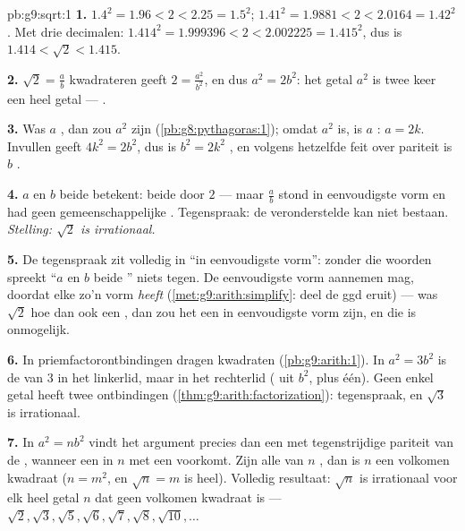 \begin{solution}{pb:g9:sqrt:1}
\textbf{1.} $1.4^2 = 1.96 < 2 < 2.25 = 1.5^2$;
$1.41^2 = 1.9881 < 2 < 2.0164 = 1.42^2$. Met drie decimalen:
$1.414^2 = 1.999396 < 2 < 2.002225 = 1.415^2$, dus is
$1.414 < \sqrt2 < 1.415$.

\textbf{2.} $\sqrt2 = \frac ab$ kwadrateren geeft $2 = \frac{a^2}{b^2}$, en dus
$a^2 = 2b^2$: het getal $a^2$ is twee keer een heel getal --- \emph{}.

\textbf{3.} Was $a$ , dan zou $a^2$  zijn
(\cref{pb:g8:pythagoras:1}); omdat $a^2$  is, is $a$ : $a = 2k$.
Invullen geeft $4k^2 = 2b^2$, dus is $b^2 = 2k^2$ , en volgens hetzelfde feit
over pariteit is $b$ .

\textbf{4.} $a$ en $b$ beide  betekent: beide  door $2$ --- maar
$\frac ab$ stond in eenvoudigste vorm en had geen gemeenschappelijke .
Tegenspraak: de veronderstelde  kan niet bestaan. \emph{Stelling: $\sqrt2$ is
irrationaal.}

\textbf{5.} De tegenspraak zit volledig in ``in eenvoudigste vorm'': zonder die
woorden spreekt ``$a$ en $b$ beide '' niets tegen. De eenvoudigste vorm
aannemen mag, doordat elke  zo'n vorm \emph{heeft}
(\cref{met:g9:arith:simplify}: deel de ggd eruit) --- was $\sqrt2$ hoe dan ook een
, dan zou het een  in eenvoudigste vorm zijn, en die is onmogelijk.

\textbf{6.} In priemfactorontbindingen dragen kwadraten  
(\cref{pb:g9:arith:1}). In $a^2 = 3b^2$ is de  van $3$  in het
linkerlid, maar  in het rechterlid ( uit $b^2$, plus één). Geen enkel
getal heeft twee ontbindingen (\cref{thm:g9:arith:factorization}): tegenspraak, en
$\sqrt3$ is irrationaal.

\textbf{7.} In $a^2 = n b^2$ vindt het argument precies dan een  met
tegenstrijdige pariteit van de , wanneer een  in $n$ met een
\emph{}  voorkomt. Zijn alle  van $n$ , dan is $n$ een
volkomen kwadraat ($n = m^2$, en $\sqrt n = m$ is heel). Volledig resultaat:
$\sqrt n$ is irrationaal voor elk heel getal $n$ dat geen volkomen kwadraat is ---
$\sqrt2, \sqrt3, \sqrt5, \sqrt6, \sqrt7, \sqrt8, \sqrt{10}, \dots$


\end{solution}
